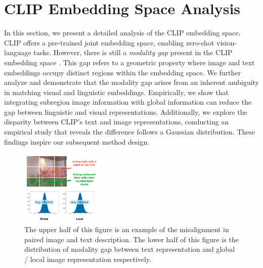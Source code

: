 
\section{CLIP Embedding Space Analysis}
In this section, we present a detailed analysis of the CLIP embedding space. CLIP offers a pre-trained joint embedding space, enabling zero-shot vision-language tasks. However, there is still a \textit{modality gap} present in the CLIP embedding space \cite{MindGap}. This gap refers to a geometric property where image and text embeddings occupy distinct regions within the embedding space. We further analyze and demonstrate that the modality gap arises from an inherent ambiguity in matching visual and linguistic embeddings. Empirically, we show that integrating subregion image information with global information can reduce the gap between linguistic and visual representations. Additionally, we explore the disparity between CLIP's text and image representations, conducting an empirical study that reveals the difference follows a Gaussian distribution. These findings inspire our subsequent method design.
  

\begin{figure}[t!]
  \centering
  \includegraphics[width=0.35\textwidth]{AnonymousSubmission/LaTeX/asserts/ana_fig.png}
   \caption{The upper half of this figure is an example of the misalignment in paired image and text description. The lower half of this figure is the distribution of modality gap between text representation and global / local image representation respectively.}
    \label{figure:ex}
\end{figure}


